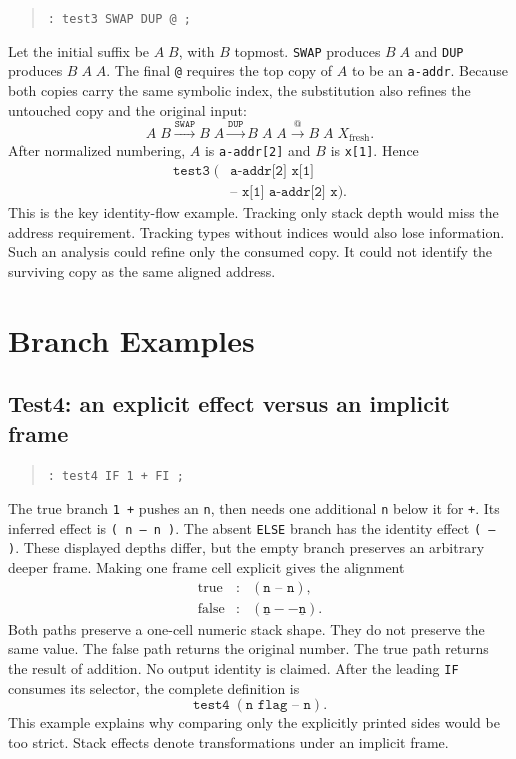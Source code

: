 \documentclass[11pt,a4paper]{article}
\newcommand{\effect}[1]{\mbox{\texttt{#1}}}
\begin{document}
\begin{quote}
\texttt{: test3  SWAP DUP @ ;}
\end{quote}
Let the initial suffix be $A\;B$, with $B$ topmost.  \texttt{SWAP} produces
$B\;A$ and \texttt{DUP} produces $B\;A\;A$.  The final \texttt{@} requires
the top copy of $A$ to be an \texttt{a-addr}.  Because both copies carry the
same symbolic index, the substitution also refines the untouched copy and the
original input:
\[
 A\;B
 \xrightarrow{\texttt{SWAP}} B\;A
 \xrightarrow{\texttt{DUP}} B\;A\;A
 \xrightarrow{\texttt{@}} B\;A\;X_{\mathrm{fresh}}.
\]
After normalized numbering, $A$ is \texttt{a-addr[2]} and $B$ is
\texttt{x[1]}.  Hence
\[
\begin{split}
 \texttt{test3}\;(&\texttt{a-addr[2] x[1]}\\
                  &\texttt{-- x[1] a-addr[2] x}).
\end{split}
\]
This is the key identity-flow example.  Tracking only stack depth would miss
the address requirement.  Tracking types without indices would also lose
information.  Such an analysis could refine only the consumed copy.  It could
not identify the surviving copy as the same aligned address.

\section{Branch Examples}
\label{sec:branch-examples}

\subsection{Test4: an explicit effect versus an implicit frame}

\begin{quote}
\texttt{: test4  IF 1 + FI ;}
\end{quote}
The true branch \texttt{1 +} pushes an \texttt{n}, then needs one additional
\texttt{n} below it for \texttt{+}.  Its inferred effect is
\effect{( n -- n )}.  The absent \texttt{ELSE} branch has the identity effect
\effect{( -- )}.  These displayed depths differ, but the empty branch preserves
an arbitrary deeper frame.  Making one frame cell explicit gives the
alignment
\[
\begin{array}{rcl}
 \text{true}  &:& (\texttt{n -- n}),\\
 \text{false} &:& (\underline{\texttt{n}} --
                       \underline{\texttt{n}}).
\end{array}
\]
Both paths preserve a one-cell numeric stack shape.  They do not preserve the
same value.  The false path returns the original number.  The true path returns
the result of addition.  No output identity is claimed.
After the leading \texttt{IF} consumes its selector, the complete definition is
\[
                    \texttt{test4}\;(\texttt{n flag -- n}).
\]
This example explains why comparing only the explicitly printed sides would be
too strict.  Stack effects denote transformations under an implicit frame.
\end{document}
